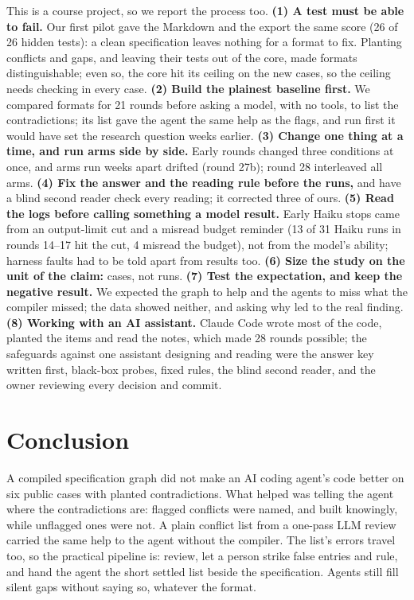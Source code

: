 \documentclass{article}
\begin{document}
This is a course project, so we report the process too.
\textbf{(1) A test must be able to fail.} Our first pilot gave the Markdown and the export the same score
(26 of 26 hidden tests): a clean specification leaves nothing for a format to fix. Planting conflicts and
gaps, and leaving their tests out of the core, made formats distinguishable; even so, the core hit its
ceiling on the new cases, so the ceiling needs checking in every case.
\textbf{(2) Build the plainest baseline first.} We compared formats for 21 rounds before asking a model,
with no tools, to list the contradictions; its list gave the agent the same help as the flags, and run
first it would have set the research question weeks earlier.
\textbf{(3) Change one thing at a time, and run arms side by side.} Early rounds changed three conditions
at once, and arms run weeks apart drifted (round 27b); round 28 interleaved all arms.
\textbf{(4) Fix the answer and the reading rule before the runs,} and have a blind second reader check
every reading; it corrected three of ours.
\textbf{(5) Read the logs before calling something a model result.} Early Haiku stops came from an
output-limit cut and a misread budget reminder (13 of 31 Haiku runs in rounds 14--17 hit the cut, 4
misread the budget), not from the model's ability; harness faults had to be told apart from results too.
\textbf{(6) Size the study on the unit of the claim:} cases, not runs.
\textbf{(7) Test the expectation, and keep the negative result.} We expected the graph to help and the
agents to miss what the compiler missed; the data showed neither, and asking why led to the real finding.
\textbf{(8) Working with an AI assistant.} Claude Code wrote most of the code, planted the items and read the
notes, which made 28 rounds possible; the safeguards against one assistant designing and reading were the
answer key written first, black-box probes, fixed rules, the blind second reader, and the owner reviewing
every decision and commit.

\section{Conclusion}

A compiled specification graph did not make an AI coding agent's code better on six public cases with
planted contradictions. What helped was telling the agent where the contradictions are: flagged
conflicts were named, and built knowingly, while unflagged ones were not. A plain conflict list from a
one-pass LLM review carried the same help to the agent without the compiler. The
list's errors travel too, so the practical pipeline is: review, let a person strike false entries and
rule, and hand the agent the short settled list beside the specification. Agents still fill silent gaps
without saying so, whatever the format.
\end{document}
